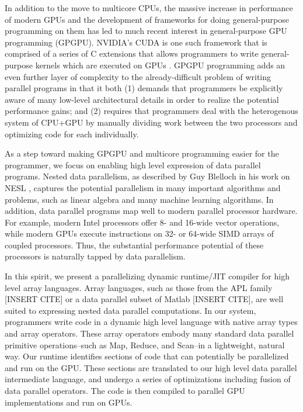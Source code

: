 \documentclass[preprint]{sigplanconf}
\begin{document}
In addition to the move to multicore CPUs, the massive increase in performance
of modern GPUs and the development of frameworks for doing general-purpose
programming on them has led to much recent interest in general-purpose GPU
programming (GPGPU).  NVIDIA's CUDA is one such framework that is comprised of
a series of C extensions that allows programmers to write general-purpose
kernels which are executed on GPUs \cite{NvidCU}.  GPGPU programming adds an
even further layer of complexity to the already-difficult problem of writing
parallel programs in that it both (1) demands that programmers be explicitly aware
of many low-level architectural details in order to realize the potential
performance gains; and (2) requires that programmers deal with the
heterogenous system of CPU+GPU by manually dividing work between the two
processors and optimizing code for each individually.

As a step toward making GPGPU and multicore programming easier for the
programmer, we focus on enabling high level expression of data parallel
programs. Nested data parallelism, as described by Guy Blelloch in his work on
NESL \cite{Blel90}, captures the potential parallelism in many important
algorithms and problems, such as linear algebra and many machine learning
algorithms.  In addition, data parallel programs map well to modern
parallel processor hardware. For example, modern Intel processors offer 8- and
16-wide vector operations, while modern GPUs execute instructions on 32- or
64-wide SIMD arrays of coupled processors. Thus, the substantial
performance potential of these processors is naturally tapped by data
parallelism.

In this spirit, we present a parallelizing dynamic runtime/JIT compiler for
high level array languages.  Array languages, such as those from the APL family
[INSERT CITE] or a data parallel subset of Matlab [INSERT CITE], are well suited
to expressing nested data parallel computations. In our system, programmers
write code in a dynamic high level language with native array types and array
operators. These array operators embody many standard data parallel primitive
operations--such as Map, Reduce, and Scan--in a lightweight, natural way.  Our
runtime identifies sections of code that can potentially be parallelized and
run on the GPU.  These sections are translated to our high level data parallel
intermediate language, and undergo a series of optimizations including fusion
of data parallel operators.  The code is then compiled to parallel GPU
implementations and run on GPUs.
\end{document}
